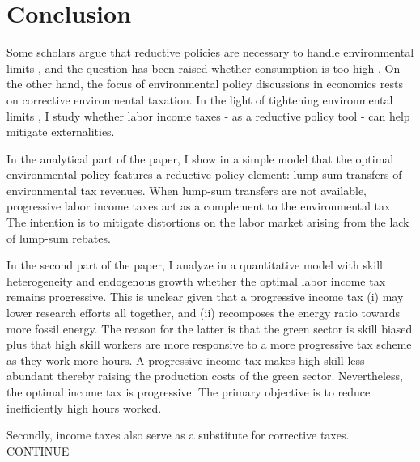 \section{Conclusion}\label{sec:con}
Some scholars argue that  reductive policies are necessary to handle environmental limits \citep{Schor2005SustainableReductionb, VanVuuren2018AlternativeTechnologies, Bertram2018TargetedScenarios}, and the question has been raised whether consumption is too high \citep{Arrow2004AreMuch}. On the other hand, the focus of environmental policy discussions in economics rests on corrective environmental taxation. In the light of tightening environmental limits \citep{Rockstrom2009AHumanity, IPCC2022}, I study whether labor income taxes - as a reductive policy tool - can help mitigate externalities. 

In the analytical part of the paper, I show in a simple model that the optimal environmental policy features a reductive policy element: lump-sum transfers of environmental tax revenues. When lump-sum transfers are not available, progressive labor income taxes act as a complement to the environmental tax. The intention is to mitigate distortions on the labor market arising from the lack of lump-sum rebates. %


In the second part of the paper, I analyze in a quantitative model with skill heterogeneity and endogenous growth whether the optimal labor income tax remains progressive.
This is unclear given that a progressive income tax (i) may lower research efforts all together, and (ii) recomposes the energy ratio towards more fossil energy. The reason for the latter is that the green sector is skill biased plus that high skill workers are more responsive to a more progressive tax scheme as they work more hours. 
A progressive income tax makes high-skill less abundant thereby raising the production costs of the green sector. 
Nevertheless, the optimal income tax is progressive. The primary objective is to reduce inefficiently high hours worked. 

Secondly, income taxes also serve as a substitute for corrective taxes.
CONTINUE

